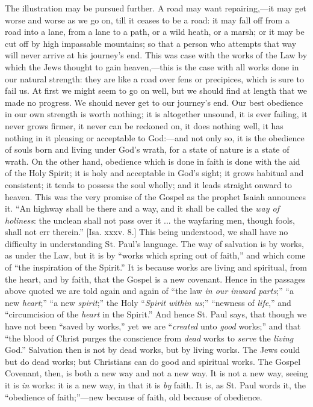 The illustration may be pursued further. A road may want repairing,—it
may get worse and worse as we go on, till it ceases to be a road: it
may fall off from a road into a lane, from a lane to a path, or a wild
heath, or a marsh; or it may be cut off by high impassable mountains;
so that a person who attempts that way will never arrive at his
journey's end. This was case with the works of the Law by which the
Jews thought to gain heaven,—this is the case with all works done in
our natural strength: they are like a road over fens or precipices,
which is sure to fail us. At first we might seem to go on well, but we
should find at length that we made no progress. We should never get to
our journey's end. Our best obedience in our own strength is worth
nothing; it is altogether unsound, it is ever failing, it never grows
firmer, it never can be reckoned on, it does nothing well, it has
nothing in it pleasing or acceptable to God:—and not only so, it is
the obedience of souls born and living under God's wrath, for a state
of nature is a state of wrath. On the other hand, obedience which is
done in faith is done with the aid of the Holy Spirit; it is holy and
acceptable in God's sight; it grows habitual and consistent; it tends
to possess the soul wholly; and it leads straight onward to heaven.
This was the very promise of the Gospel as the prophet Isaiah
announces it. ``An highway shall be there and a way, and it shall
be called the \emph{way of holiness}: the unclean shall not pass over
it ... the wayfaring men, though fools, shall not err therein.'' [Isa.
xxxv. 8.] This being understood, we shall have no difficulty in
understanding St. Paul's language. The way of salvation is by works,
as under the Law, but it is by ``works which spring out of
faith,'' and which come of ``the inspiration of the
Spirit.'' It is because works are living and spiritual, from the
heart, and by faith, that the Gospel is a new covenant. Hence in the
passages above quoted we are told again and again of ``the law \emph{in
our inward parts};'' ``a new \emph{heart};'' ``a new \emph{spirit};''
the Holy ``\emph{Spirit within us};'' ``newness of \emph{life},''
and ``circumcision of the \emph{heart} in the Spirit.'' And
hence St. Paul says, that though we have not been ``saved by
works,'' yet we are ``\emph{created} unto \emph{good}
works;'' and that ``the blood of Christ purges the conscience
from \emph{dead} works to \emph{serve} the \emph{living} God.''
Salvation then is not by dead works, but by living works. The Jews
could but do dead works; but Christians can do good and spiritual
works. The Gospel Covenant, then, is both a new way and not a new way.
It is not a new way, seeing it is \emph{in} works: it is a new way, in
that it is \emph{by} faith. It is, as St. Paul words it, the
``obedience of faith;''—new because of faith, old because of
obedience.

